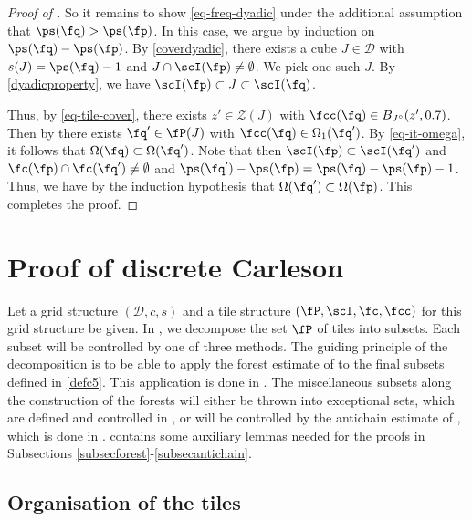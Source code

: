 \begin{proof}[Proof of ]
    So it remains to show \eqref{eq-freq-dyadic} under the additional assumption that $\ps(\fq) > \ps(\fp)$. In this case, we argue by induction on $\ps(\fq)-\ps(\fp)$. By \eqref{coverdyadic}, there exists a cube $J \in \mathcal{D}$ with $s(J) = \ps(\fq) - 1$ and $J \cap\scI(\fp) \ne \emptyset$. We pick one such $J$. By \eqref{dyadicproperty}, we have $\scI(\fp) \subset J \subset \scI(\fq)$.

    Thus, by \eqref{eq-tile-cover}, there exists $z' \in \mathcal{Z}(J)$ with $\fcc(\fq) \in B_{J^\circ}(z', 0.7)$. Then by  there exists $\fq' \in \fP(J)$ with $\fcc(\fq) \in\Omega_1(\fq')$.
    By \eqref{eq-it-omega}, it follows that $\Omega(\fq) \subset \Omega(\fq')$. Note that then $\scI(\fp) \subset \scI(\fq')$ and $\fc(\fp) \cap \fc(\fq') \ne \emptyset$ and $\ps(\fq') - \ps(\fp) = \ps(\fq) - \ps(\fp) - 1$. Thus, we have by the induction hypothesis that $\Omega(\fq') \subset \Omega(\fp)$. This completes the proof.
\end{proof}

\chapter{Proof of discrete Carleson}
\label{proptopropprop}



Let a grid structure $(\mathcal{D}, c, s)$ and a tile structure $(\fP, \scI, \fc, \fcc)$ for this grid structure be given. In , we decompose the set $\fP$ of tiles into subsets. Each subset will be controlled by one of three methods. The guiding principle of the decomposition is to be able to apply the forest estimate of  to the final subsets defined in \eqref{defc5}. This application is done in . The miscellaneous subsets along the construction of the forests will either be thrown into exceptional sets, which are defined and controlled in , or will be controlled by the antichain estimate of , which is done in .  contains some auxiliary lemmas needed for the proofs in Subsections \ref{subsecforest}-\ref{subsecantichain}.

\section{Organisation of the tiles}\label{subsectilesorg}

